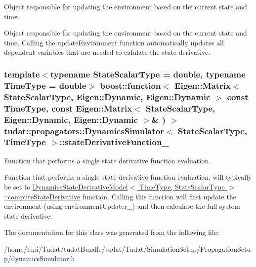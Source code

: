 Object responsible for updating the environment based on the current state and time. 

Object responsible for updating the environment based on the current state and time. Calling the update\+Environment function automatically updates all dependent variables that are needed to calulate the state derivative. 
\subsubsection[{\texorpdfstring{state\+Derivative\+Function\+\_\+}{stateDerivativeFunction_}}]{\setlength{\rightskip}{0pt plus 5cm}template$<$typename State\+Scalar\+Type  = double, typename Time\+Type  = double$>$ boost\+::function$<$ Eigen\+::\+Matrix$<$ State\+Scalar\+Type, Eigen\+::\+Dynamic, Eigen\+::\+Dynamic $>$ const Time\+Type, const Eigen\+::\+Matrix$<$ State\+Scalar\+Type, Eigen\+::\+Dynamic, Eigen\+::\+Dynamic $>$\& ) $>$ {\bf tudat\+::propagators\+::\+Dynamics\+Simulator}$<$ State\+Scalar\+Type, Time\+Type $>$\+::state\+Derivative\+Function\+\_\+\hspace{0.3cm}{\ttfamily [protected]}}\hypertarget{classtudat_1_1propagators_1_1DynamicsSimulator_af70e7d7f3f0d4020ad5daba0b0d29a06}{}\label{classtudat_1_1propagators_1_1DynamicsSimulator_af70e7d7f3f0d4020ad5daba0b0d29a06}


Function that performs a single state derivative function evaluation. 

Function that performs a single state derivative function evaluation, will typically be set to \hyperlink{classtudat_1_1propagators_1_1DynamicsStateDerivativeModel_a21c8ce5580f81720dd6ddce728ec0b48}{Dynamics\+State\+Derivative\+Model$<$ Time\+Type, State\+Scalar\+Type $>$\+::compute\+State\+Derivative} function. Calling this function will first update the environment (using environment\+Updater\+\_\+) and then calculate the full system state derivative. 

The documentation for this class was generated from the following file\+:\begin{DoxyCompactItemize}
\item 
/home/lupi/\+Tudat/tudat\+Bundle/tudat/\+Tudat/\+Simulation\+Setup/\+Propagation\+Setup/dynamics\+Simulator.\+h\end{DoxyCompactItemize}
